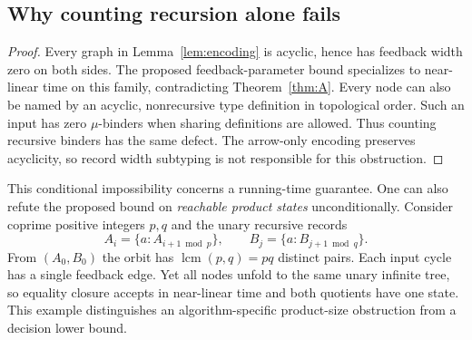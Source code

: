 \documentclass[11pt,letterpaper]{article}
\theoremstyle{definition}\newtheorem{definition}[theorem]{Definition}
\newcommand{\rec}[1]{\{#1\}}
\begin{document}
\subsection{Why counting recursion alone fails}
\begin{proof}
Every graph in Lemma~\ref{lem:encoding} is acyclic, hence has feedback width zero on both sides. The proposed feedback-parameter bound specializes to near-linear time on this family, contradicting Theorem~\ref{thm:A}. Every node can also be named by an acyclic, nonrecursive type definition in topological order. Such an input has zero $\mu$-binders when sharing definitions are allowed. Thus counting recursive binders has the same defect. The arrow-only encoding preserves acyclicity, so record width subtyping is not responsible for this obstruction.
\end{proof}

This conditional impossibility concerns a running-time guarantee. One can also refute the proposed bound on \emph{reachable product states} unconditionally. Consider coprime positive integers $p,q$ and the unary recursive records
\[
 A_i=\rec{a:A_{i+1\bmod p}},\qquad
 B_j=\rec{a:B_{j+1\bmod q}}.
\]
From $(A_0,B_0)$ the orbit has $\operatorname{lcm}(p,q)=pq$ distinct pairs. Each input cycle has a single feedback edge. Yet all nodes unfold to the same unary infinite tree, so equality closure accepts in near-linear time and both quotients have one state. This example distinguishes an algorithm-specific product-size obstruction from a decision lower bound.
\end{document}
